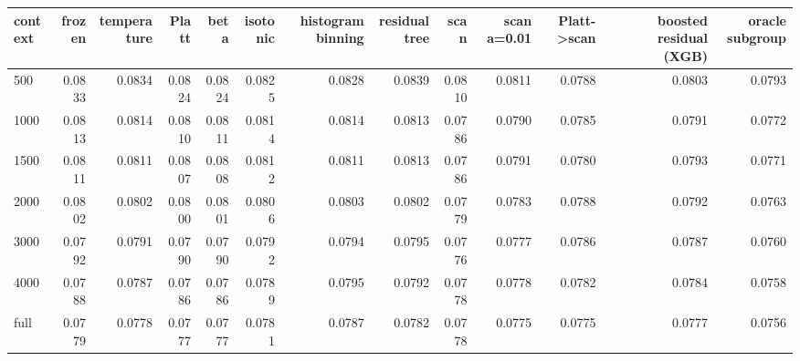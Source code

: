 \begin{tabular}{lrrrrrrrrrrrr}
\toprule
context & frozen & temperature & Platt & beta & isotonic & histogram binning & residual tree & scan & scan a=0.01 & Platt->scan & boosted residual (XGB) & oracle subgroup \\
\midrule
500 & 0.0833 & 0.0834 & 0.0824 & 0.0824 & 0.0825 & 0.0828 & 0.0839 & 0.0810 & 0.0811 & 0.0788 & 0.0803 & 0.0793 \\
1000 & 0.0813 & 0.0814 & 0.0810 & 0.0811 & 0.0814 & 0.0814 & 0.0813 & 0.0786 & 0.0790 & 0.0785 & 0.0791 & 0.0772 \\
1500 & 0.0811 & 0.0811 & 0.0807 & 0.0808 & 0.0812 & 0.0811 & 0.0813 & 0.0786 & 0.0791 & 0.0780 & 0.0793 & 0.0771 \\
2000 & 0.0802 & 0.0802 & 0.0800 & 0.0801 & 0.0806 & 0.0803 & 0.0802 & 0.0779 & 0.0783 & 0.0788 & 0.0792 & 0.0763 \\
3000 & 0.0792 & 0.0791 & 0.0790 & 0.0790 & 0.0792 & 0.0794 & 0.0795 & 0.0776 & 0.0777 & 0.0786 & 0.0787 & 0.0760 \\
4000 & 0.0788 & 0.0787 & 0.0786 & 0.0786 & 0.0789 & 0.0795 & 0.0792 & 0.0778 & 0.0778 & 0.0782 & 0.0784 & 0.0758 \\
full & 0.0779 & 0.0778 & 0.0777 & 0.0777 & 0.0781 & 0.0787 & 0.0782 & 0.0778 & 0.0775 & 0.0775 & 0.0777 & 0.0756 \\
\bottomrule
\end{tabular}
